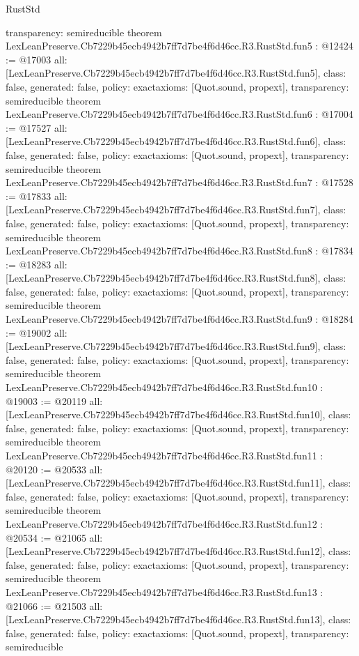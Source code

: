 \begin{lexlean}{RustStd}
\begin{coremodule}
{  transparency: semireducible
}
theorem LexLeanPreserve.Cb7229b45ecb4942b7ff7d7be4f6d46cc.R3.RustStd.fun5 : @12424 := @17003 {
  all: [LexLeanPreserve.Cb7229b45ecb4942b7ff7d7be4f6d46cc.R3.RustStd.fun5],
  class: false,
  generated: false,
  policy: exact{axioms: [Quot.sound, propext]},
  transparency: semireducible
}
theorem LexLeanPreserve.Cb7229b45ecb4942b7ff7d7be4f6d46cc.R3.RustStd.fun6 : @17004 := @17527 {
  all: [LexLeanPreserve.Cb7229b45ecb4942b7ff7d7be4f6d46cc.R3.RustStd.fun6],
  class: false,
  generated: false,
  policy: exact{axioms: [Quot.sound, propext]},
  transparency: semireducible
}
theorem LexLeanPreserve.Cb7229b45ecb4942b7ff7d7be4f6d46cc.R3.RustStd.fun7 : @17528 := @17833 {
  all: [LexLeanPreserve.Cb7229b45ecb4942b7ff7d7be4f6d46cc.R3.RustStd.fun7],
  class: false,
  generated: false,
  policy: exact{axioms: [Quot.sound, propext]},
  transparency: semireducible
}
theorem LexLeanPreserve.Cb7229b45ecb4942b7ff7d7be4f6d46cc.R3.RustStd.fun8 : @17834 := @18283 {
  all: [LexLeanPreserve.Cb7229b45ecb4942b7ff7d7be4f6d46cc.R3.RustStd.fun8],
  class: false,
  generated: false,
  policy: exact{axioms: [Quot.sound, propext]},
  transparency: semireducible
}
theorem LexLeanPreserve.Cb7229b45ecb4942b7ff7d7be4f6d46cc.R3.RustStd.fun9 : @18284 := @19002 {
  all: [LexLeanPreserve.Cb7229b45ecb4942b7ff7d7be4f6d46cc.R3.RustStd.fun9],
  class: false,
  generated: false,
  policy: exact{axioms: [Quot.sound, propext]},
  transparency: semireducible
}
theorem LexLeanPreserve.Cb7229b45ecb4942b7ff7d7be4f6d46cc.R3.RustStd.fun10 : @19003 := @20119 {
  all: [LexLeanPreserve.Cb7229b45ecb4942b7ff7d7be4f6d46cc.R3.RustStd.fun10],
  class: false,
  generated: false,
  policy: exact{axioms: [Quot.sound, propext]},
  transparency: semireducible
}
theorem LexLeanPreserve.Cb7229b45ecb4942b7ff7d7be4f6d46cc.R3.RustStd.fun11 : @20120 := @20533 {
  all: [LexLeanPreserve.Cb7229b45ecb4942b7ff7d7be4f6d46cc.R3.RustStd.fun11],
  class: false,
  generated: false,
  policy: exact{axioms: [Quot.sound, propext]},
  transparency: semireducible
}
theorem LexLeanPreserve.Cb7229b45ecb4942b7ff7d7be4f6d46cc.R3.RustStd.fun12 : @20534 := @21065 {
  all: [LexLeanPreserve.Cb7229b45ecb4942b7ff7d7be4f6d46cc.R3.RustStd.fun12],
  class: false,
  generated: false,
  policy: exact{axioms: [Quot.sound, propext]},
  transparency: semireducible
}
theorem LexLeanPreserve.Cb7229b45ecb4942b7ff7d7be4f6d46cc.R3.RustStd.fun13 : @21066 := @21503 {
  all: [LexLeanPreserve.Cb7229b45ecb4942b7ff7d7be4f6d46cc.R3.RustStd.fun13],
  class: false,
  generated: false,
  policy: exact{axioms: [Quot.sound, propext]},
  transparency: semireducible
}
\end{coremodule}
\end{lexlean}
